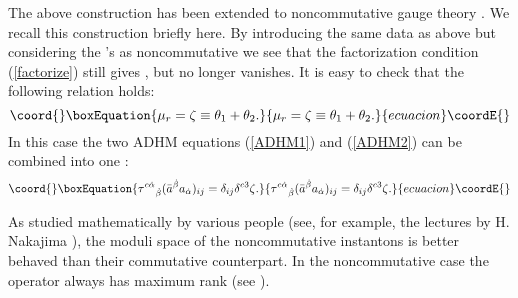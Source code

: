 \documentclass[a4paper,a4paper]{article}
\begin{document}
The above construction has been extended to noncommutative gauge
theory \cite{Schwarz}. We recall this construction briefly here.
By introducing the same data as above but considering the \coordHE{}'s
as noncommutative we see that the factorization condition
(\ref{factorize}) still gives \coordHE{}, but \coordHE{} no longer
vanishes. It is easy to check that the following relation holds:
\begin{equation}\coord{}\boxEquation{ \mu_r=\zeta\equiv\theta_1+\theta_2.
}{ \mu_r=\zeta\equiv\theta_1+\theta_2.
}{ecuacion}\coordE{}\end{equation}
In this case the two ADHM equations (\ref{ADHM1}) and
(\ref{ADHM2}) can be combined into one \cite{Paperd}:
\begin{equation}\coord{}\boxEquation{
\label{ADHM} \tau^{c\dot\alpha}{}_{\dot\beta}(\bar a^{\dot\beta}
a_{\dot\alpha})_{ij}=\delta_{ij}\delta^{c3}\zeta.
}{
\tau^{c\dot\alpha}{}_{\dot\beta}(\bar a^{\dot\beta}
a_{\dot\alpha})_{ij}=\delta_{ij}\delta^{c3}\zeta.
}{ecuacion}\coordE{}\end{equation}

As studied mathematically by various people (see, for example, the
lectures by H. Nakajima \cite{Nakajima}), the moduli space of the
noncommutative instantons is better behaved than their commutative
counterpart. In the noncommutative case the operator
\myHighlight{$\Delta^\dagger\Delta$}\coordHE{} always has maximum rank (see
\cite{Reviewa}).
\end{document}
